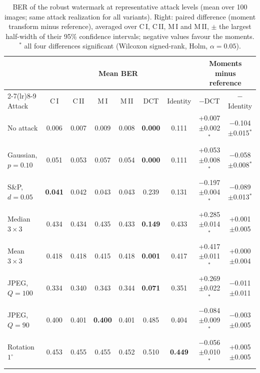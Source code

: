 \begin{table}[t]
\centering
\caption{BER of the robust watermark at representative attack levels (mean over 100 images; same attack realization for all variants). Right: paired difference (moment transform minus reference), averaged over C\,I, C\,II, M\,I and M\,II, $\pm$ the largest half-width of their 95\% confidence intervals; negative values favour the moments. $^{\ast}$ all four differences significant (Wilcoxon signed-rank, Holm, $\alpha=0.05$).}
\label{tab:ablation6_ber}
\footnotesize
\setlength{\tabcolsep}{2pt}
\begin{tabular}{lcccccccc}
\toprule
 & \multicolumn{6}{c}{Mean BER} & \multicolumn{2}{c}{Moments minus reference} \\
\cmidrule(lr){2-7}\cmidrule(lr){8-9}
Attack & C\,I & C\,II & M\,I & M\,II & DCT & Identity & $-$DCT & $-$Identity \\
\midrule
No attack & 0.006 & 0.007 & 0.009 & 0.008 & \textbf{0.000} & 0.111 & +0.007$\pm$0.002$^{\ast}$ & $-$0.104$\pm$0.015$^{\ast}$ \\
Gaussian, $p=0.10$ & 0.051 & 0.053 & 0.057 & 0.054 & \textbf{0.000} & 0.111 & +0.053$\pm$0.008$^{\ast}$ & $-$0.058$\pm$0.008$^{\ast}$ \\
S\&P, $d=0.05$ & \textbf{0.041} & 0.042 & 0.043 & 0.043 & 0.239 & 0.131 & $-$0.197$\pm$0.004$^{\ast}$ & $-$0.089$\pm$0.013$^{\ast}$ \\
Median $3\times3$ & 0.434 & 0.434 & 0.435 & 0.433 & \textbf{0.149} & 0.433 & +0.285$\pm$0.014$^{\ast}$ & +0.001$\pm$0.005 \\
Mean $3\times3$ & 0.418 & 0.418 & 0.415 & 0.418 & \textbf{0.001} & 0.417 & +0.417$\pm$0.011$^{\ast}$ & +0.000$\pm$0.004 \\
JPEG, $Q=100$ & 0.334 & 0.340 & 0.343 & 0.344 & \textbf{0.071} & 0.351 & +0.269$\pm$0.022$^{\ast}$ & $-$0.011$\pm$0.011 \\
JPEG, $Q=90$ & 0.400 & 0.401 & \textbf{0.400} & 0.401 & 0.485 & 0.404 & $-$0.084$\pm$0.009$^{\ast}$ & $-$0.003$\pm$0.005 \\
Rotation $1^\circ$ & 0.453 & 0.455 & 0.455 & 0.452 & 0.510 & \textbf{0.449} & $-$0.056$\pm$0.010$^{\ast}$ & +0.005$\pm$0.005 \\
\bottomrule
\end{tabular}
\end{table}
